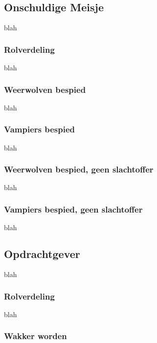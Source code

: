 \documentclass[12pt]{article}
\begin{document}
  \subsection{Onschuldige Meisje}
    
      blah
  
    \subsubsection{Rolverdeling}
    
      blah
    
    \subsubsection{Weerwolven bespied}
    
      blah
    
    \subsubsection{Vampiers bespied}
    
      blah
    
    \subsubsection{Weerwolven bespied, geen slachtoffer}
    
      blah
    
    \subsubsection{Vampiers bespied, geen slachtoffer}
    
      blah
  
  \subsection{Opdrachtgever}
    
      blah
  
    \subsubsection{Rolverdeling}
    
      blah
    
    \subsubsection{Wakker worden}
    
\end{document}

